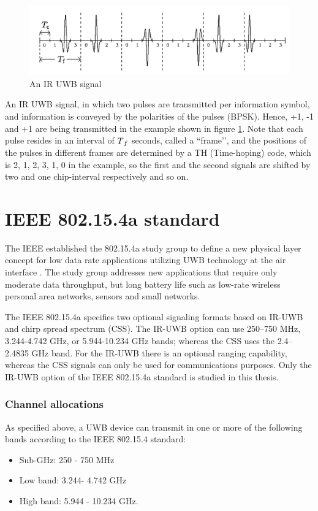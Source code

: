 \documentclass[\main/main.tex]{subfiles}
\begin{document}
\begin{figure}[H]
    \centering
    \includegraphics[width=1\textwidth]{an_ir_uwb_signal}
    \caption{An IR UWB signal}
    \label{fig:an_ir_uwb_signal}
\end{figure}

An IR UWB signal, in which two pulses are transmitted per information symbol, and information is conveyed by the polarities of the pulses (BPSK). Hence, +1, -1 and +1 are being transmitted in the example shown in figure \ref{fig:an_ir_uwb_signal}. Note that each pulse resides in an interval of $T\textsubscript{$f$}$ seconds, called a “frame’’, and the positions of the pulses in different frames are determined by a TH (Time-hoping) code, which is {2, 1, 2, 3, 1, 0} in the example, so the first and the second signals are shifted by two and one chip-interval respectively and so on. 

\section{IEEE 802.15.4a standard}
The IEEE established the 802.15.4a study group to define a new physical layer concept for low data rate applications utilizing UWB technology at the air interface \cite{IEEE_Std_802_15_4_2015}. The study group addresses new applications that require only moderate data throughput, but long battery life such as low-rate wireless personal area networks, sensors and small networks.

The IEEE 802.15.4a specifies two optional signaling formats based on IR-UWB and chirp spread spectrum (CSS). The IR-UWB option can use 250–750 MHz, 3.244-4.742 GHz, or 5.944-10.234 GHz bands; whereas the CSS uses the 2.4–2.4835 GHz band. For the IR-UWB there is an optional ranging capability, whereas the CSS signals can only be used for communications purposes. Only the IR-UWB option of the IEEE 802.15.4a standard is studied in this thesis.

\subsubsection{Channel allocations}
As specified above, a UWB device can transmit in one or more of the following bands according to the IEEE 802.15.4 standard:
\begin{itemize}
    \item Sub-GHz: 250 - 750 MHz
    \item Low band: 3.244- 4.742 GHz
    \item High band: 5.944 - 10.234 GHz.
\end{itemize}
\end{document}
